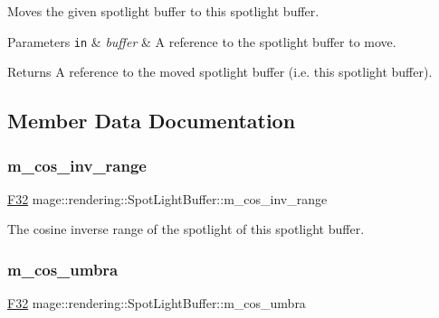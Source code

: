 Moves the given spotlight buffer to this spotlight buffer.


\begin{DoxyParams}[1]{Parameters}
\mbox{\tt in}  & {\em buffer} & A reference to the spotlight buffer to move. \\
\hline
\end{DoxyParams}
\begin{DoxyReturn}{Returns}
A reference to the moved spotlight buffer (i.\+e. this spotlight buffer). 
\end{DoxyReturn}


\subsection{Member Data Documentation}
\hypertarget{structmage_1_1rendering_1_1_spot_light_buffer_a80c169b3f3e87c7d91a7b2b4473e4136}{}\label{structmage_1_1rendering_1_1_spot_light_buffer_a80c169b3f3e87c7d91a7b2b4473e4136} 
\subsubsection{\texorpdfstring{m\+\_\+cos\+\_\+inv\+\_\+range}{m\_cos\_inv\_range}}
{\footnotesize\ttfamily \hyperlink{namespacemage_aa97e833b45f06d60a0a9c4fc22ae02c0}{F32} mage\+::rendering\+::\+Spot\+Light\+Buffer\+::m\+\_\+cos\+\_\+inv\+\_\+range}

The cosine inverse range of the spotlight of this spotlight buffer. \hypertarget{structmage_1_1rendering_1_1_spot_light_buffer_afa3c23903a4b31bf6b7da537d7f9b660}{}\label{structmage_1_1rendering_1_1_spot_light_buffer_afa3c23903a4b31bf6b7da537d7f9b660} 
\subsubsection{\texorpdfstring{m\+\_\+cos\+\_\+umbra}{m\_cos\_umbra}}
{\footnotesize\ttfamily \hyperlink{namespacemage_aa97e833b45f06d60a0a9c4fc22ae02c0}{F32} mage\+::rendering\+::\+Spot\+Light\+Buffer\+::m\+\_\+cos\+\_\+umbra}

